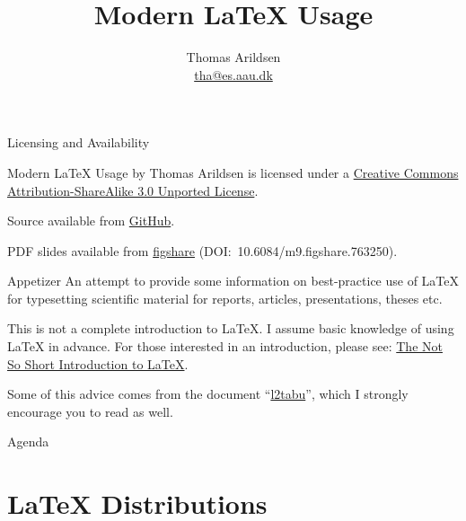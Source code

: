 \documentclass[english]{beamer}
\title{Modern \LaTeX{} Usage}
\author[Thomas Arildsen]
{
  Thomas Arildsen\\
  \href{mailto:tha@es.aau.dk}{{\ttfamily tha@es.aau.dk}}\\
  \ccbysa
}
\institute[TPS, Dept. of Electronic Systems, Aalborg University]
{ TPS\\
  Dept. of Electronic Systems\\
  Aalborg University}
\date{}
\begin{document}
\begin{frame}[plain]
  \titlepage
\end{frame}

\begin{frame}{Licensing and Availability}
  \begin{block}{}
    Modern LaTeX Usage by Thomas Arildsen is licensed under a
    \href{http://creativecommons.org/licenses/by-sa/3.0/deed.da}{Creative
      Commons Attribution-ShareAlike 3.0 Unported License}.
    \begin{center}
      \ccbysa
    \end{center}
  \end{block}
  \begin{block}{}
    Source available from
    \href{https://github.com/ThomasA/modernLaTeX}{GitHub}.
  \end{block}
  \begin{block}{}
    PDF slides available from
    \href{http://dx.doi.org/10.6084/m9.figshare.763250}{figshare}
    (\mbox{DOI: 10.6084/m9.figshare.763250}).
  \end{block}
\end{frame}

\begin{frame}{Appetizer}
  An attempt to provide some information on best-practice use of LaTeX
  for typesetting scientific material for reports, articles,
  presentations, theses etc.

  This is not a complete introduction to \LaTeX. I assume basic
  knowledge of using \LaTeX{} in advance. For those interested in an
  introduction, please see:
  \href{ftp://ftp.dante.de/tex-archive/info/lshort/english/lshort.pdf}{The
    Not So Short Introduction to \LaTeX}.

  Some of this advice comes from the document
  ``\href{ftp://ftp.dante.de/tex-archive/info/l2tabu/english/l2tabuen.pdf}{l2tabu}'',
  which I strongly encourage you to read as well.
\end{frame}

\begin{frame}{Agenda}
  \tableofcontents
\end{frame}


\section{\LaTeX{} Distributions}
\end{document}
